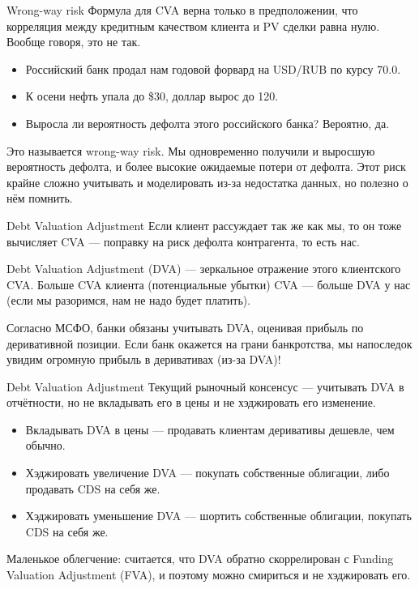 \documentclass{beamer}
\begin{document}
\begin{frame}{Wrong-way risk}
\justify
Формула для CVA верна только в предположении, что корреляция между кредитным качеством клиента и PV сделки равна нулю. Вообще говоря, это не так.
\begin{itemize}
\justifying
\item Российский банк продал нам годовой форвард на USD/RUB по курсу 70.0.
\item К осени нефть упала до \$30, доллар вырос до 120.
\item Выросла ли вероятность дефолта этого российского банка? Вероятно, да.
\end{itemize}

Это называется wrong-way risk. Мы одновременно получили и выросшую вероятность дефолта, и более высокие ожидаемые потери от дефолта. Этот риск крайне сложно учитывать и моделировать из-за недостатка данных, но полезно о нём помнить.
\end{frame}



\begin{frame}{Debt Valuation Adjustment}
\justify
Если клиент рассуждает так же как мы, то он тоже вычисляет CVA --- поправку на риск дефолта контрагента, то есть нас.

\vspace{\baselineskip}
Debt Valuation Adjustment (DVA) --- зеркальное отражение этого клиентского CVA. Больше CVA клиента (потенциальные убытки) CVA --- больше DVA у нас (если мы разоримся, нам не надо будет платить).

\vspace{\baselineskip}
Согласно МСФО, банки обязаны учитывать DVA, оценивая прибыль по деривативной позиции. Если банк окажется на грани банкротства, мы напоследок увидим огромную прибыль в деривативах (из-за DVA)!
\end{frame}



\begin{frame}{Debt Valuation Adjustment}
\justify
Текущий рыночный консенсус --- учитывать DVA в отчётности, но не вкладывать его в цены и не хэджировать его изменение.

\begin{itemize}
\justifying
\item Вкладывать DVA в цены --- продавать клиентам деривативы дешевле, чем обычно.
\item Хэджировать увеличение DVA --- покупать собственные облигации, либо продавать CDS на себя же.
\item Хэджировать уменьшение DVA --- шортить собственные облигации, покупать CDS на себя же.
\end{itemize}

Маленькое облегчение: считается, что DVA обратно скоррелирован с Funding Valuation Adjustment (FVA), и поэтому можно смириться и не хэджировать его.
\end{frame}
\end{document}
